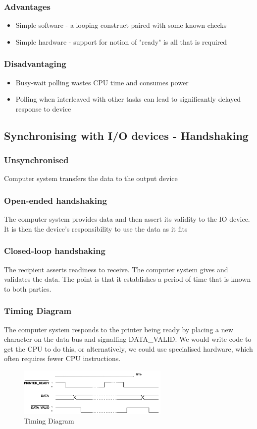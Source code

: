 \documentclass[a4paper]{article}
\theoremstyle{plain}
\theoremstyle{definition}
\theoremstyle{remark}
\begin{document}
\subsubsection{Advantages}
\begin{itemize}
	\item Simple software - a looping construct paired with some known checks
	\item Simple hardware - support for notion of "ready" is all that is required
\end{itemize}
\subsubsection{Disadvantaging}
\begin{itemize}
	\item Busy-wait polling wastes CPU time and consumes power
	\item Polling when interleaved with other tasks can lead to significantly delayed response to device
\end{itemize}
\subsection{Synchronising with I/O devices - Handshaking}
\subsubsection{Unsynchronised}
Computer system transfers the data to the output device
\subsubsection{Open-ended handshaking}
The computer system provides data and then assert its validity to the IO device. It is then the device's responsibility to use the data as it fits
\subsubsection{Closed-loop handshaking}
The recipient asserts readiness to receive. The computer system gives and validates the data. The point is that it establishes a period of time that is known to both parties.
\subsubsection{Timing Diagram}
The computer system responds to the printer being ready by placing a new character on the data bus and signalling DATA\_VALID. We would write code to get the CPU to do this, or alternatively, we could use specialised hardware, which often requires fewer CPU instructions.
\begin{figure}[H]
	\centering
	\includegraphics[width=0.65\textwidth]{figures/timing.png}
	\caption{Timing Diagram}
	\label{fig:timing}
\end{figure}
\end{document}
